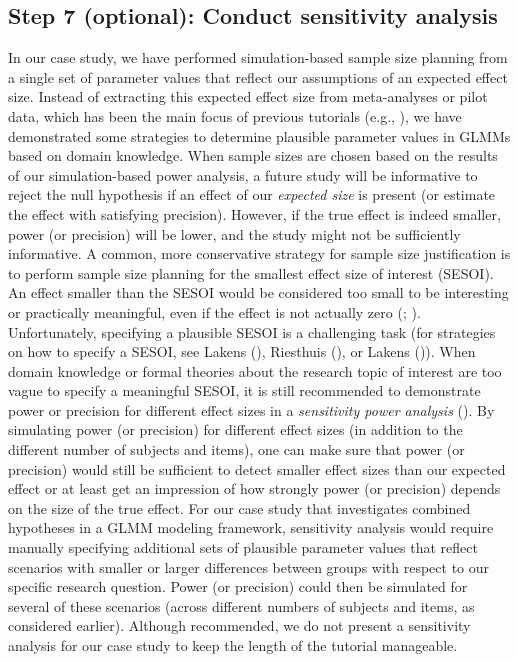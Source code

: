 \documentclass[
  man,
  floatsintext,
  longtable,
  a4paper,
  nolmodern,
  notxfonts,
  notimes,
  colorlinks=true,linkcolor=blue,citecolor=blue,urlcolor=blue]{apa7}
\begin{document}
\subsection{Step 7 (optional): Conduct sensitivity
analysis}\label{step-7-optional-conduct-sensitivity-analysis}

In our case study, we have performed simulation-based sample size
planning from a single set of parameter values that reflect our
assumptions of an expected effect size. Instead of extracting this
expected effect size from meta-analyses or pilot data, which has been
the main focus of previous tutorials (e.g.,
),
we have demonstrated some strategies to determine plausible parameter
values in GLMMs based on domain knowledge. When sample sizes are chosen
based on the results of our simulation-based power analysis, a future
study will be informative to reject the null hypothesis if an effect of
our \emph{expected size} is present (or estimate the effect with
satisfying precision). However, if the true effect is indeed smaller,
power (or precision) will be lower, and the study might not be
sufficiently informative. A common, more conservative strategy for
sample size justification is to perform sample size planning for the
smallest effect size of interest (SESOI). An effect smaller than the
SESOI would be considered too small to be interesting or practically
meaningful, even if the effect is not actually zero
(;
). Unfortunately, specifying a plausible SESOI is a
challenging task (for strategies on how to specify a SESOI, see Lakens
(), Riesthuis
(), or
Lakens ()). When
domain knowledge or formal theories about the research topic of interest
are too vague to specify a meaningful SESOI, it is still recommended to
demonstrate power or precision for different effect sizes in a
\emph{sensitivity power analysis}
(). By
simulating power (or precision) for different effect sizes (in addition
to the different number of subjects and items), one can make sure that
power (or precision) would still be sufficient to detect smaller effect
sizes than our expected effect or at least get an impression of how
strongly power (or precision) depends on the size of the true effect.
For our case study that investigates combined hypotheses in a GLMM
modeling framework, sensitivity analysis would require manually
specifying additional sets of plausible parameter values that reflect
scenarios with smaller or larger differences between groups with respect
to our specific research question. Power (or precision) could then be
simulated for several of these scenarios (across different numbers of
subjects and items, as considered earlier). Although recommended, we do
not present a sensitivity analysis for our case study to keep the length
of the tutorial manageable.
\end{document}
